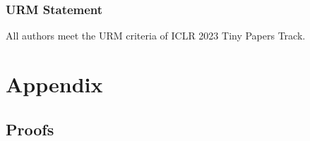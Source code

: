 \documentclass{article} %
\begin{document}

\subsubsection*{URM Statement}
All authors meet the URM criteria of ICLR 2023 Tiny Papers Track.




\appendix
\section{Appendix}

\subsection{Proofs}
\label{sec:proofs}
\end{document}
